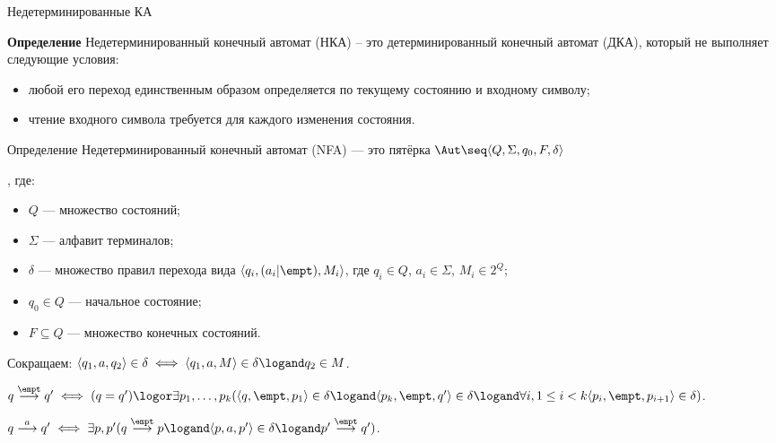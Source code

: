 \begin{frame}{Недетерминированные КА} {\vspace{-5pt}}
    \vspace{-5pt}
     {
        \begin{block}{\bf Определение}
            Недетерминированный конечный автомат (НКА) -- это детерминированный конечный автомат (ДКА), который не выполняет следующие условия:
            \begin{itemize}
                \item любой его переход единственным образом определяется по текущему состоянию и входному символу;
                \item чтение входного символа требуется для каждого изменения состояния.
            \end{itemize}
        \end{block}
    }
     {
        \begin{block}{Определение}
            Недетерминированный конечный автомат (NFA) --- это пятёрка $\Aut\seq\langle Q,\Sigma, q_0, F, \delta \rangle${, где:
                    \begin{itemize}
                        \item $Q$ --- множество состояний;
                        \item $\Sigma$ --- алфавит терминалов;
                        \item $\delta$ --- множество правил перехода вида $\langle q_i, (a_i|\empt), M_i\rangle$, где $q_i\in Q$, $a_i\in \Sigma$, $M_i\in 2^Q$;
                        \item $q_0\in Q$ --- начальное состояние;
                        \item $F\subseteq Q$ --- множество конечных состояний.
                    \end{itemize}}
        \end{block}

        Сокращаем: $\langle q_1, a, q_2\rangle\in \delta\iff \langle q_1,a,M\rangle\in\delta\logand q_2\in M$.
    }
     {
        \begin{wideitemize}
            \item $q \overset{\empt}{\longrightarrow} q'\iff (q=q')\logor\exists p_1,\dots,p_{k}(\langle q,\empt, p_1\rangle\in \delta\logand \langle p_k,\empt,q'\rangle\in\delta\logand\forall i,1\leq i<k\langle p_i,\empt,p_{i+1}\rangle\in\delta)$.

            \item $q\overset{a}{\longrightarrow}q'\iff \exists p,p'(q\overset{\empt}{\longrightarrow}p\logand \langle p, a, p'\rangle\in\delta\logand p'\overset{\empt}{\longrightarrow}q')$.


\end{wideitemize}}
\end{frame}
